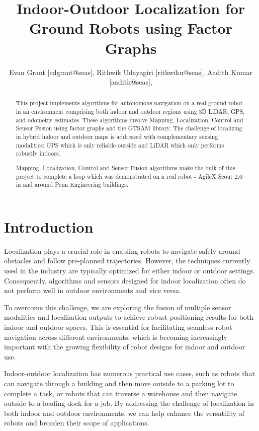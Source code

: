 \documentclass[10pt, reqno, letterpaper, twoside]{amsart}
\title{Indoor-Outdoor Localization for Ground Robots using Factor Graphs}
\author{
Evan Grant [edgrant@seas],
Rithwik Udayagiri [rithwiku@seas],
Aadith Kumar [aadith@seas],
}
\begin{document}
% 

\begin{abstract}

This project implements algorithms for autonomous navigation on a real ground robot in an environment comprising both indoor and outdoor regions using 3D LiDAR, GPS, and odometry estimates. These algorithms involve Mapping, Localization, Control and Sensor Fusion using factor graphs and the GTSAM library. The challenge of localizing in hybrid indoor and outdoor maps is addressed with complementary sensing modalities: GPS which is only reliable outside and LiDAR which only performs robustly indoors.

Mapping, Localization, Control and Sensor Fusion algorithms make the bulk of this project to complete a loop which was demonstrated on a real robot - AgileX Scout 2.0 in and around Penn Engineering buildings.
\end{abstract}

\maketitle

\section{Introduction}

Localization plays a crucial role in enabling robots to navigate safely around obstacles and follow pre-planned trajectories. However, the techniques currently used in the industry are typically optimized for either indoor or outdoor settings. Consequently, algorithms and sensors designed for indoor localization often do not perform well in outdoor environments and vice versa.

To overcome this challenge, we are exploring the fusion of multiple sensor modalities and localization outputs to achieve robust positioning results for both indoor and outdoor spaces. This is essential for facilitating seamless robot navigation across different environments, which is becoming increasingly important with the growing flexibility of robot designs for indoor and outdoor use.

Indoor-outdoor localization has numerous practical use cases, such as robots that can navigate through a building and then move outside to a parking lot to complete a task, or robots that can traverse a warehouse and then navigate outside to a loading dock for a job. By addressing the challenge of localization in both indoor and outdoor environments, we can help enhance the versatility of robots and broaden their scope of applications.
\end{document}
